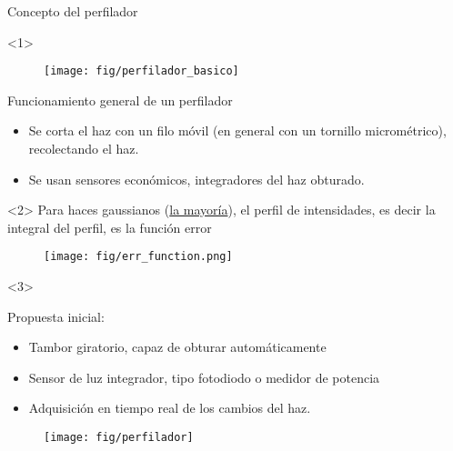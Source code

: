 \begin{frame}[fragile]{Concepto del perfilador}
\begin{onlyenv}<1>
\begin{minipage}[t]{0.5\textwidth}
\begin{figure}
\centering
\texttt{[image: fig/perfilador\_basico]}
\label{fig:perfilador_basico}
\end{figure}
\end{minipage}
%
\begin{minipage}[t]{0.45\textwidth}
Funcionamiento general de un perfilador
\begin{itemize}
\item  Se corta el haz con un filo móvil (en general con un tornillo micrométrico), recolectando el haz.
\item Se usan sensores económicos, integradores del haz obturado.
\end{itemize}
\end{minipage}
\end{onlyenv}


\begin{onlyenv}<2>
\centering
Para haces gaussianos (\underline{la mayoría}), el perfil de intensidades, es decir la integral del perfil, es la función error

\begin{figure}
\centering
\texttt{[image: fig/err\_function.png]}
\label{fig:err_function}
\end{figure}

\end{onlyenv}

\begin{onlyenv}<3>
\begin{minipage}[t]{0.45\textwidth}
Propuesta inicial:
\begin{itemize}
\item Tambor giratorio, capaz de obturar automáticamente
\item Sensor de luz integrador, tipo fotodiodo o medidor de potencia
\item Adquisición en tiempo real de los cambios del haz.
\end{itemize}
\end{minipage}
%
\begin{minipage}[t]{0.5\textwidth}
\begin{figure}[H]
\centering
\texttt{[image: fig/perfilador]}
\label{fig:perfilador}
\end{figure}
\end{minipage}
\end{onlyenv}

\end{frame}

